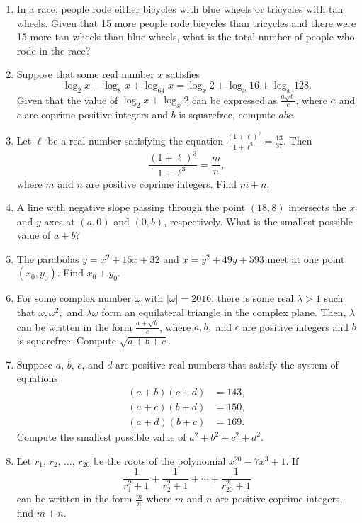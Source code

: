 \documentclass[10pt]{article}
\begin{document}
\begin{enumerate}
\setlength{\itemsep}{3pt}

\item In a race, people rode either bicycles with blue wheels or tricycles with
tan wheels. Given that 15 more people rode bicycles than tricycles and there
were 15 more tan wheels than blue wheels, what is the total number of people
who rode in the race?

\item Suppose that some real number $x$ satisfies
\[\log_2 x + \log_8 x + \log_{64} x = \log_x 2 + \log_x 16 + \log_x 128.\]
Given that the value of $\log_2 x + \log_x 2$ can be expressed as $\tfrac{a\sqrt{b}}{c}$, where $a$ and $c$ are coprime positive integers and $b$ is squarefree, compute $abc$.

\item Let $\ell$ be a real number satisfying the equation
$\tfrac{(1+\ell)^2}{1+\ell^2}=\tfrac{13}{37}$.  Then
\[\frac{(1+\ell)^3}{1+\ell^3}=\frac mn,\] where $m$ and $n$ are positive
coprime integers.  Find $m+n$.

\item A line with negative slope passing through the point $(18,8)$ intersects the $x$ and $y$ axes at $(a,0)$ and $(0,b)$, respectively.  What is the smallest possible value of $a+b$?

\item The parabolas $y=x^2+15x+32$ and $x = y^2+49y+593$ meet at one point $(x_0,y_0)$.  Find $x_0+y_0$.

\item For some complex number $\omega$ with $|\omega| = 2016$, there is some
	real $\lambda>1$ such that $\omega, \omega^{2},$ and $\lambda \omega$
	form an equilateral triangle in the complex plane. Then, $\lambda$ can be written in the form $\frac{a + \sqrt{b}}{c}$, where $a,b,$ and $c$ are positive integers and $b$ is squarefree. Compute $\sqrt{a+b+c}$.

\item Suppose $a$, $b$, $c$, and $d$ are positive real numbers that satisfy the system of equations \begin{align*}(a+b)(c+d)&=143,\\(a+c)(b+d)&=150,\\(a+d)(b+c)&=169.\end{align*} Compute the smallest possible value of $a^2+b^2+c^2+d^2$.

\item Let $r_1$, $r_2$, $\ldots$, $r_{20}$ be the roots of the polynomial $x^{20}-7x^3+1$.  If \[\dfrac{1}{r_1^2+1}+\dfrac{1}{r_2^2+1}+\cdots+\dfrac{1}{r_{20}^2+1}\] can be written in the form $\tfrac mn$ where $m$ and $n$ are positive coprime integers, find $m+n$.


\end{enumerate}
\end{document}
